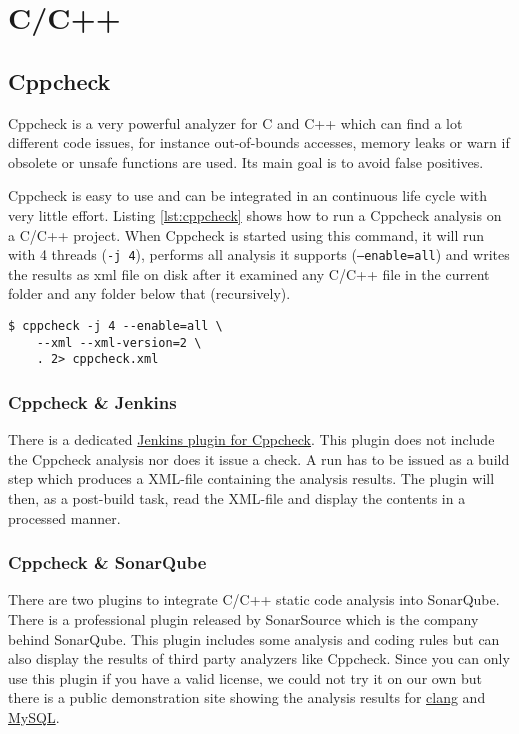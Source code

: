 \section{C/C++}

\subsection{Cppcheck}
Cppcheck is a very powerful analyzer for C and C++ which can find a lot different code issues, for instance out-of-bounds accesses, memory leaks or warn if obsolete or unsafe functions are used. Its main goal is to avoid false positives.

Cppcheck is easy to use and can be integrated in an continuous life cycle with very little effort.
Listing \ref{lst:cppcheck} shows how to run a Cppcheck analysis on a C/C++ project. When Cppcheck is started using this command, it will run with 4 threads (\texttt{-j 4}), performs all analysis it supports (\texttt{--enable=all}) and writes the results as xml file on disk after it examined any C/C++ file in the current folder and any folder below that (recursively).

\begin{lstlisting}[caption={Bash command to run Cppcheck},label={lst:cppcheck}]
$ cppcheck -j 4 --enable=all \
	--xml --xml-version=2 \
	. 2> cppcheck.xml
\end{lstlisting}


\subsubsection{Cppcheck \& Jenkins}
There is a dedicated \href{https://wiki.jenkins-ci.org/display/JENKINS/Cppcheck+Plugin}{Jenkins plugin for Cppcheck}. This plugin does not include the Cppcheck analysis nor does it issue a check. A run has to be issued as a build step which produces a XML-file containing the analysis results. The plugin will then, as a post-build task, read the XML-file and display the contents in a processed manner.

\subsubsection{Cppcheck \& SonarQube}
There are two plugins to integrate C/C++ static code analysis into SonarQube. There is a professional plugin released by SonarSource which is the company behind SonarQube. This plugin includes some analysis and coding rules but can also display the results of third party analyzers like Cppcheck. Since you can only use this plugin if you have a valid license, we could not try it on our own but there is a public demonstration site showing the analysis results for \href{http://nemo.sonarqube.org/dashboard/index/clang}{clang} and \href{http://nemo.sonarqube.org/dashboard/index/mysql}{MySQL}. 

